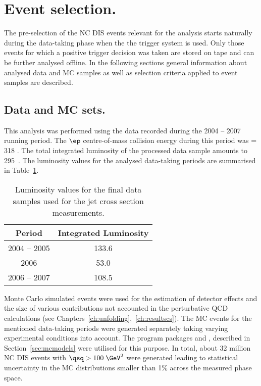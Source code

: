 \section{Event selection.}
The pre-selection of the NC DIS events relevant for the analysis starts naturally during the data-taking phase when the the \zeus trigger system is used. Only those events for which a positive trigger decision was taken are stored on tape and can be further analysed offline. In the following sections general information about analysed data and MC samples as well as selection criteria applied to event samples are described.

\subsection{Data and MC sets.}
This analysis was performed using the data recorded during the 2004 -- 2007 \hera running period. The $\ep$ centre-of-mass collision energy during this period was \sqs = 318 \GeV. The total integrated luminosity of the processed data sample amounts to 295~\invpb. The luminosity values for the analysed data-taking periods are summarised in Table~\ref{tab:selecteddatasample}.

\begin{table}[htpb!]
	\centering
		\begin{tabular}[h]{c|c}
		  \hline
			Period & Integrated Luminosity \\
			\hline \hline
			2004 -- 2005  & 133.6 \invpb  \\
			2006             & 53.0 \invpb   \\
			2006 -- 2007  & 108.5 \invpb \\
			\hline
		\end{tabular}
	\caption{Luminosity values for the final data samples used for the jet cross section measurements.}
	\label{tab:selecteddatasample}
\end{table}

Monte Carlo simulated events were used for the estimation of detector effects and the size of various contributions not accounted in the perturbative QCD calculations (see Chapters~\ref{ch:unfolding},~\ref{ch:resultscs}). The MC events for the mentioned data-taking periods were generated separately taking varying experimental conditions into account. The program packages \lepto and \ariadne{}, described in Section~\ref{sec:mcmodels} were utilised for this purpose. In total, about 32 million NC DIS events with $\qsq > 100\;\GeV^2$ were generated leading to statistical uncertainty in the MC distributions smaller than 1\% across the measured phase space. 

